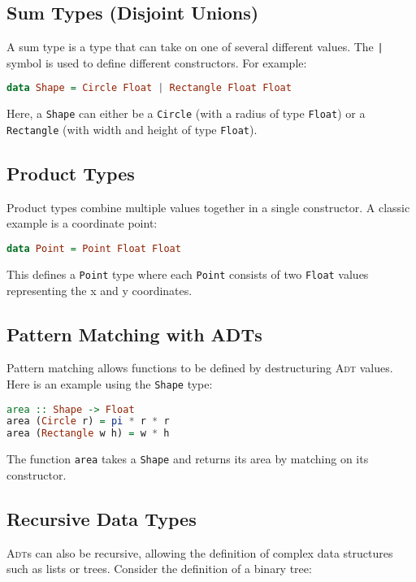 \subsection{Sum Types (Disjoint Unions)}
A sum type is a type that can take on one of several different values. The \texttt{|} symbol is used to define different constructors. For example:

\begin{lstlisting}[style=haskellstyle, language=Haskell]
data Shape = Circle Float | Rectangle Float Float
\end{lstlisting}
Here, a \texttt{Shape} can either be a \texttt{Circle} (with a radius of type \texttt{Float}) or a
\texttt{Rectangle} (with width and height of type \texttt{Float}). 

\subsection{Product Types}
Product types combine multiple values together in a single constructor. A classic example is a coordinate point:

\begin{lstlisting}[style=haskellstyle, language=Haskell]
data Point = Point Float Float
\end{lstlisting}
This defines a \texttt{Point} type where each \texttt{Point} consists of two \texttt{Float} values representing
the x and y coordinates. 

\subsection{Pattern Matching with \textsc{ADT}s}
Pattern matching allows functions to be defined by destructuring \textsc{Adt} values. Here is an example using the \texttt{Shape} type:

\begin{lstlisting}[style=haskellstyle, language=Haskell]
area :: Shape -> Float
area (Circle r) = pi * r * r
area (Rectangle w h) = w * h
\end{lstlisting}
The function \texttt{area} takes a \texttt{Shape} and returns its area by matching on its constructor.

\subsection{Recursive Data Types}
\textsc{Adt}s can also be recursive, allowing the definition of complex data structures such as lists or trees. Consider the definition of a binary tree:

